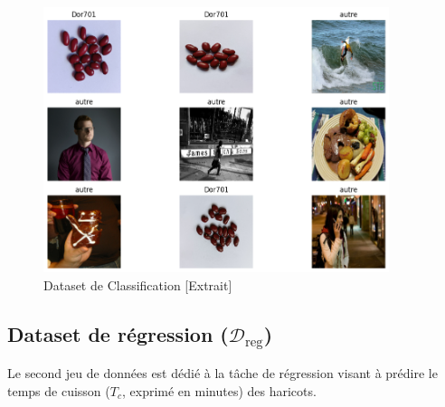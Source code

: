 \begin{figure}[H]
	\centering
	\includegraphics[width=0.9\textwidth]{figures/dataset_classification.png}
	\caption{Dataset de Classification [Extrait]}
	\label{fig:c_dataset}
\end{figure}

\subsection{Dataset de régression (\(\mathcal{D}_{\text{reg}}\))}

Le second jeu de données est dédié à la tâche de régression visant à prédire le temps de cuisson (\(T_c\), exprimé en minutes) des haricots.

